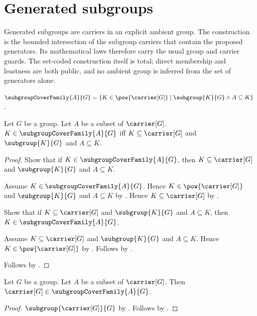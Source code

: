 

\section{Generated subgroups}

Generated subgroups are carriers in an explicit ambient group.  The
construction is the bounded intersection of the subgroup carriers that
contain the proposed generators.  Its mathematical laws therefore carry the
usual group and carrier guards.  The set-coded construction itself is total;
direct membership and leastness are both public, and no ambient group is
inferred from the set of generators alone.

\begin{definition}\label{subgroup_cover_family}
    $\subgroupCoverFamily{A}{G}=
        \{K\in\pow{\carrier[G]}\mid
            \subgroup{K}{G}\land A\subseteq K\}$.
\end{definition}

\begin{proposition}\label{subgroup_cover_family_iff}
    Let $G$ be a group.
    Let $A$ be a subset of $\carrier[G]$.
    $K\in\subgroupCoverFamily{A}{G}$ iff
        $K\subseteq\carrier[G]$ and
        $\subgroup{K}{G}$ and
        $A\subseteq K$.
\end{proposition}
\begin{proof}
    Show that if $K\in\subgroupCoverFamily{A}{G}$, then
        $K\subseteq\carrier[G]$ and
        $\subgroup{K}{G}$ and
        $A\subseteq K$.
    \begin{subproof}
        Assume $K\in\subgroupCoverFamily{A}{G}$.
        Hence $K\in\pow{\carrier[G]}$ and
            $\subgroup{K}{G}$ and $A\subseteq K$ by
            .
        Hence $K\subseteq\carrier[G]$ by .
    \end{subproof}
    Show that if $K\subseteq\carrier[G]$ and
        $\subgroup{K}{G}$ and $A\subseteq K$, then
        $K\in\subgroupCoverFamily{A}{G}$.
    \begin{subproof}
        Assume $K\subseteq\carrier[G]$ and
            $\subgroup{K}{G}$ and $A\subseteq K$.
        Hence $K\in\pow{\carrier[G]}$ by .
        Follows by .
    \end{subproof}
    Follows by \auto.
\end{proof}

\begin{proposition}\label{subgroup_cover_family_contains_carrier}
    Let $G$ be a group.
    Let $A$ be a subset of $\carrier[G]$.
    Then $\carrier[G]\in\subgroupCoverFamily{A}{G}$.
\end{proposition}
\begin{proof}
    $\subgroup{\carrier[G]}{G}$ by
        .
    Follows by
        .
\end{proof}

